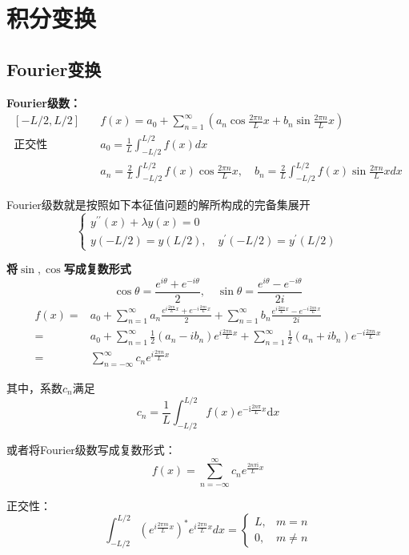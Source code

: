 \newpage
\section{积分变换}
\subsection{Fourier变换}
\noindent \textbf{Fourier级数：}
$$\begin{aligned}
    [-L/2,L/2]\quad& f(x)=a_{0}+\sum_{n=1}^{\infty}(a_{n}\cos\frac{2\pi n}{L}x+b_{n}\sin\frac{2\pi n}{L}x)\\
    \text{正交性}\quad& a_{0}=\frac{1}{L}\int_{-L/2}^{L/2}f(x)dx\\
    &a_{n}=\frac{2}{L}\int_{-L/2}^{L/2}f(x)\cos\frac{2\pi n}{L}x,\quad b_{n}=\frac{2}{L}\int_{-L/2}^{L/2}f(x)\sin\frac{2\pi n}{L}xdx
\end{aligned}$$

Fourier级数就是按照如下本征值问题的解所构成的完备集展开
$$\begin{cases}
    y^{\prime\prime}(x)+\lambda y(x)=0\\
    y(-L/2)=y(L/2),\quad y^{\prime}(-L/2)=y^{\prime}(L/2)
\end{cases}$$

\noindent \textbf{将$\sin,\cos$写成复数形式}
$$\cos\theta=\frac{e^{i\theta}+e^{-i\theta}}{2},\quad\sin\theta=\frac{e^{i\theta}-e^{-i\theta}}{2i}$$
$$\begin{aligned}
    f(x)=&a_{0}+\sum_{n=1}^{\infty}a_{n}\frac{e^{i\frac{2\pi n}{L}x}+e^{-i\frac{2\pi n}{L}x}}{2}+\sum_{n=1}^{\infty}b_{n}\frac{e^{i\frac{2\pi n}{L}x}-e^{-i\frac{2\pi n}{L}x}}{2i}\\
    =&a_{0}+\sum_{n=1}^{\infty}\frac{1}{2}(a_{n}-ib_{n})e^{i\frac{2\pi n}{L}x}+\sum_{n=1}^{\infty}\frac{1}{2}(a_{n}+ib_{n})e^{-i\frac{2\pi n}{L}x}\\
    =&\sum_{n=-\infty}^{\infty}c_{n}e^{i\frac{2\pi n}{L}x}
\end{aligned}$$

其中，系数$c_n$满足
$$c_n=\frac1L\int_{-L/2}^{L/2}f(x)e^{-\mathrm{i}\frac{2n\pi}Lx}\mathrm{d}x$$

或者将Fourier级数写成复数形式：
$$f(x)=\sum_{n=-\infty}^\infty c_ne^{\frac{2n\pi\mathrm{i}}Lx}$$

正交性：
$$\int_{-L/2}^{L/2}(e^{i\frac{2\pi m}{L}x})^{*}e^{i\frac{2\pi n}{L}x}dx=\begin{cases}{L,}&{m=n}\\{0,}&{m\neq n}\end{cases}$$

